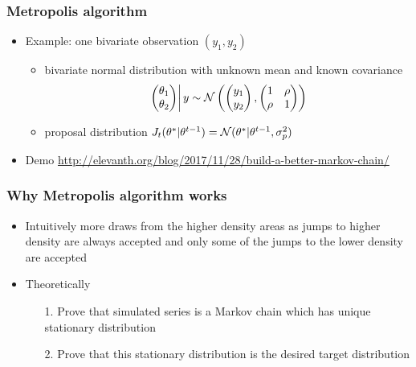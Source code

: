 \documentclass[10pt,handout]{beamer}
\begin{document}
\begin{frame}

\frametitle{ Metropolis algorithm}

  \begin{itemize}
  \item Example: one bivariate observation $(y_1,y_2)$
    \begin{itemize}
    \item bivariate normal distribution with unknown mean and known
      covariance
       \begin{equation*}
         \left.
         \begin{pmatrix}
           \theta_1\\
           \theta_2
         \end{pmatrix}
         \right| y \sim
         \mathcal{N}\left(
           \begin{pmatrix}
             y_1\\
             y_2
           \end{pmatrix},
           \begin{pmatrix}
             1 & \rho\\
             \rho & 1
         \end{pmatrix}
       \right)
       \end{equation*}
     \item proposal distribution
       $J_t(\theta^{*}|\theta^{t-1})=\mathcal{N}(\theta^{*}|\theta^{t-1},\sigma_p^2)$
     \end{itemize}
   \item Demo {\small \url{http://elevanth.org/blog/2017/11/28/build-a-better-markov-chain/}}
   \end{itemize}

\end{frame}

 \begin{frame}

\frametitle{ Why Metropolis algorithm works}

  \begin{itemize}
  \item Intuitively more draws from the higher density areas as
    jumps to higher density are always accepted and only some of the
    jumps to the lower density are accepted
    \vspace{5mm}
    \pause
  \item Theoretically
    \begin{itemize}
    \item[1.] Prove that simulated series is a Markov chain
      which has unique stationary distribution
    \item[2.] Prove that this stationary distribution is the desired target distribution
    \end{itemize}
\end{itemize}

\end{frame}
\end{document}
